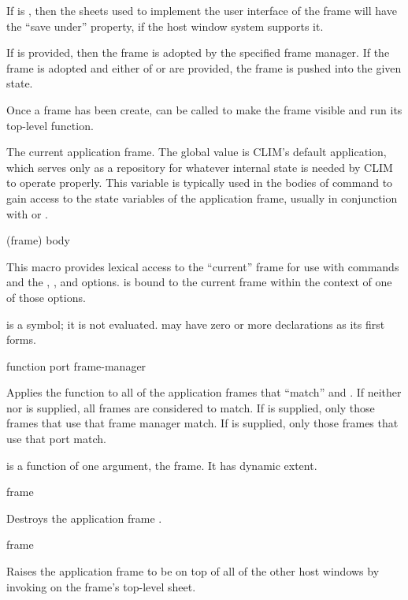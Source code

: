If  is , then the sheets used to implement the user
interface of the frame will have the ``save under'' property, if the host window
system supports it.

If  is provided, then the frame is adopted by the specified
frame manager.  If the frame is adopted and either of  or
 are provided, the frame is pushed into the given state.

Once a frame has been create,  can be called to make the
frame visible and run its top-level function.


The current application frame.  The global value is CLIM's default application,
which serves only as a repository for whatever internal state is needed by CLIM
to operate properly.  This variable is typically used in the bodies of command
to gain access to the state variables of the application frame, usually in
conjunction with  or .

 {(frame) \body body}

This macro provides lexical access to the ``current'' frame for use with
commands and the , , and  options.
 is bound to the current frame within the context of one of those
options.

 is a symbol; it is not evaluated.   may have zero or more
declarations as its first forms.

 {function \key port frame-manager}

Applies the function  to all of the application frames that
``match''  and .  If neither  nor
 is supplied, all frames are considered to match.  If
 is supplied, only those frames that use that frame manager
match.  If  is supplied, only those frames that use that port match.

 is a function of one argument, the frame.  It has dynamic extent.


 {frame}

Destroys the application frame .

 {frame}

Raises the application frame  to be on top of all of the other host
windows by invoking  on the frame's top-level sheet.

